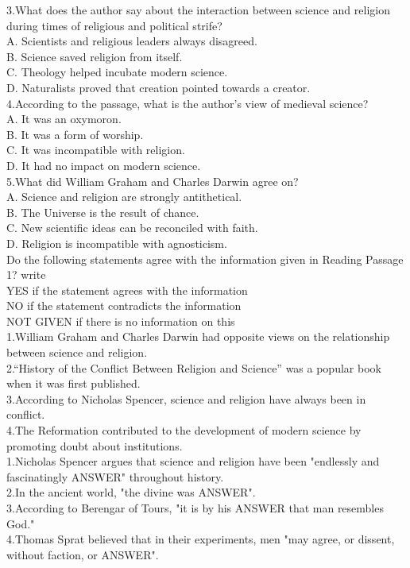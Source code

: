 \documentclass[10pt, a4paper, oneside]{article}
\begin{document}
\begin{spacing}{2.0}
3.What does the author say about the interaction between science and religion during times of religious and political strife?\\
A. Scientists and religious leaders always disagreed.\\
B. Science saved religion from itself.\\
C. Theology helped incubate modern science.\\
D. Naturalists proved that creation pointed towards a creator.\\

4.According to the passage, what is the author's view of medieval science?\\
A. It was an oxymoron.\\
B. It was a form of worship.\\
C. It was incompatible with religion.\\
D. It had no impact on modern science.\\

5.What did William Graham and Charles Darwin agree on?\\
A. Science and religion are strongly antithetical.\\
B. The Universe is the result of chance.\\
C. New scientific ideas can be reconciled with faith.\\
D. Religion is incompatible with agnosticism.\\

Do the following statements agree with the information given in Reading Passage 1?
write\\
YES if the statement agrees with the information\\
NO if the statement contradicts the information\\
NOT GIVEN if there is no information on this\\

1.William Graham and Charles Darwin had opposite views on the relationship between science and religion.\\
2.“History of the Conflict Between Religion and Science” was a popular book when it was first published.\\
3.According to Nicholas Spencer, science and religion have always been in conflict.\\
4.The Reformation contributed to the development of modern science by promoting doubt about institutions.\\

1.Nicholas Spencer argues that science and religion have been "endlessly and fascinatingly ANSWER" throughout history.\\
2.In the ancient world, "the divine was ANSWER".\\
3.According to Berengar of Tours, "it is by his ANSWER that man resembles God."\\
4.Thomas Sprat believed that in their experiments, men "may agree, or dissent, without faction, or ANSWER".\\


\end{spacing}
\end{document}
